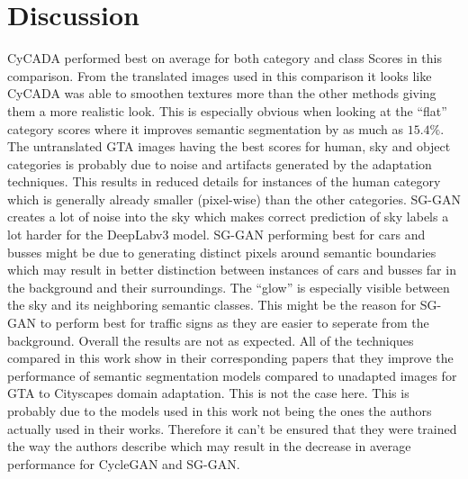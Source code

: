 \newpage

\section{Discussion}
CyCADA performed best on average for both category and class Scores in this comparison. From the translated images used in this comparison it looks like CyCADA was able to smoothen textures more than the other methods giving them a more realistic look. This is especially obvious when looking at the ``flat'' category scores where it improves semantic segmentation by as much as $15.4\%$. The untranslated GTA images having the best scores for human, sky and object categories is probably due to noise and artifacts generated by the adaptation techniques. This results in reduced details for instances of the human category which is generally already smaller (pixel-wise) than the other categories. SG-GAN creates a lot of noise into the sky which makes correct prediction of sky labels a lot harder for the DeepLabv3 model. SG-GAN performing best for cars and busses might be due to generating distinct pixels around semantic boundaries which may result in better distinction between instances of cars and busses far in the background and their surroundings. The ``glow'' is especially visible between the sky and its neighboring semantic classes. This might be the reason for SG-GAN to perform best for traffic signs as they are easier to seperate from the background. Overall the results are not as expected. All of the techniques compared in this work show in their corresponding papers that they improve the performance of semantic segmentation models compared to unadapted images for GTA to Cityscapes domain adaptation. This is not the case here. This is probably due to the models used in this work not being the ones the authors actually used in their works. Therefore it can't be ensured that they were trained the way the authors describe which may result in the decrease in average performance for CycleGAN and SG-GAN. 

